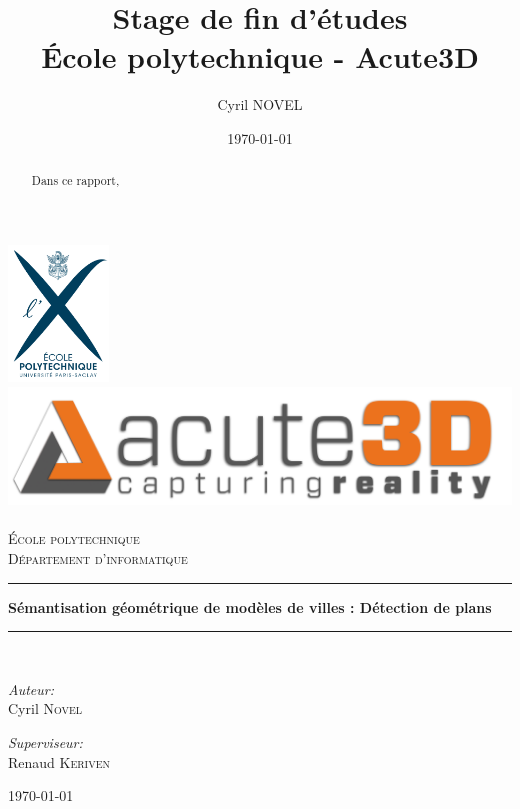 \documentclass[12pt, twoside]{article}
\title{Stage de fin d'études\\
\large{École polytechnique - Acute3D}}
\author{Cyril NOVEL}
\date{\today}
\begin{document}
\begin{titlepage}
\begin{center}
\includegraphics[width=0.20\textwidth]{LogoX.jpg}~\\[0.5cm]
\includegraphics[height=0.12\textwidth]{LogoA3D.jpg}~\\[1cm]

\textsc{\LARGE École polytechnique}\\[0.5cm]

\textsc{\Large Département d'informatique}\\[1.5cm]

\rule{\textwidth}{.4pt}
{ \huge \bfseries Sémantisation géométrique de modèles de villes : Détection de plans \\[0.4cm] }

\rule{\textwidth}{.4pt}\\[1.5cm]

\begin{minipage}{0.4\textwidth}
\begin{flushleft} \large
\emph{Auteur:}\\
Cyril \textsc{Novel}
\end{flushleft}
\end{minipage}
\begin{minipage}{0.4\textwidth}
\begin{flushright} \large
\emph{Superviseur:} \\
Renaud \textsc{Keriven}
\end{flushright}
\end{minipage}

\vfill
{\large \today}
\end{center}
\end{titlepage}

\newpage
\begin{abstract}
Dans ce rapport,
\end{abstract}~\\[5cm]
\end{document}
